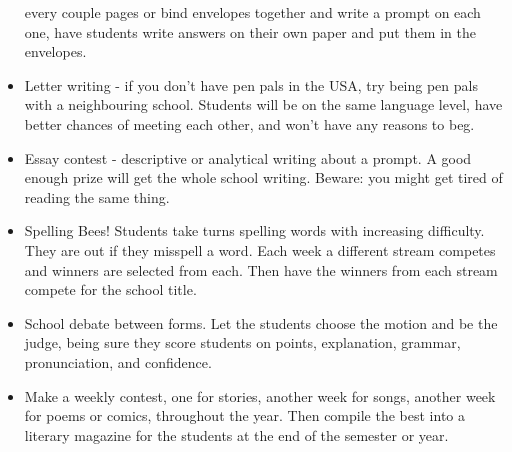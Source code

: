 \begin{itemize}
every couple pages or bind envelopes together and write a prompt on
each one, have students write answers on their own paper and put them
in the envelopes.  
\item Letter writing - if you don't have pen pals in the USA, try being
pen pals with a neighbouring school. Students will be on the same
language level, have better chances of meeting each other, and won't
have any reasons to beg. 
\item Essay contest - descriptive or analytical writing about a prompt.
A good enough prize will get the whole school writing. Beware: you
might get tired of reading the same thing.  
\item Spelling Bees! Students take turns spelling words with increasing
difficulty. They are out if they misspell a word. Each week a different
stream competes and winners are selected from each. Then have the
winners from each stream compete for the school title.  
\item School debate between forms. Let the students choose the motion and
be the judge, being sure they score students on points, explanation,
grammar, pronunciation, and confidence.  
\item Make a weekly contest, one for stories, another week for songs, another
week for poems or comics, throughout the year. Then compile the best
into a literary magazine for the students at the end of the semester
or year. 
\end{itemize}

